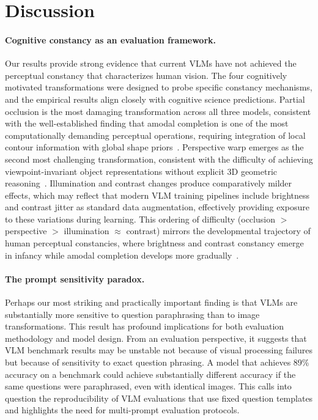 \documentclass{cvpr}
\begin{document}
\section{Discussion}
\label{sec:discussion}

\paragraph{Cognitive constancy as an evaluation framework.}
Our results provide strong evidence that current VLMs have not achieved the perceptual constancy that characterizes human vision. The four cognitively motivated transformations were designed to probe specific constancy mechanisms, and the empirical results align closely with cognitive science predictions. Partial occlusion is the most damaging transformation across all three models, consistent with the well-established finding that amodal completion is one of the most computationally demanding perceptual operations, requiring integration of local contour information with global shape priors~\cite{kanizsa1979organization, rock1989perception}. Perspective warp emerges as the second most challenging transformation, consistent with the difficulty of achieving viewpoint-invariant object representations without explicit 3D geometric reasoning~\cite{marr1982vision, dicarlo2012does}. Illumination and contrast changes produce comparatively milder effects, which may reflect that modern VLM training pipelines include brightness and contrast jitter as standard data augmentation, effectively providing exposure to these variations during learning. This ordering of difficulty (occlusion $>$ perspective $>$ illumination $\approx$ contrast) mirrors the developmental trajectory of human perceptual constancies, where brightness and contrast constancy emerge in infancy while amodal completion develops more gradually~\cite{palmer1999vision}.

\paragraph{The prompt sensitivity paradox.}
Perhaps our most striking and practically important finding is that VLMs are substantially more sensitive to question paraphrasing than to image transformations. This result has profound implications for both evaluation methodology and model design. From an evaluation perspective, it suggests that VLM benchmark results may be unstable not because of visual processing failures but because of sensitivity to exact question phrasing. A model that achieves 89\% accuracy on a benchmark could achieve substantially different accuracy if the same questions were paraphrased, even with identical images. This calls into question the reproducibility of VLM evaluations that use fixed question templates and highlights the need for multi-prompt evaluation protocols.
\end{document}
